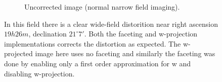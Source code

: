 \begin{figure}[h!]
\begin{subfigure}[b]{0.65\textwidth}
    \caption{Uncorrected image (normal narrow field imaging).}
 \end{subfigure}
 \caption[Supernova reminant G55.7+3.4]{In this field there is a clear wide-field distorition near
 right ascension $19h26m$, declination $21^\circ7'$. Both the faceting and w-projection
 implementations corrects the distortion as expected. The w-projected image here uses no faceting
 and similarly the faceting was done by enabling only a first order approximation for w and disabling
 w-projection.}
 \label{FIG_SUPERNOVA}
\end{figure}